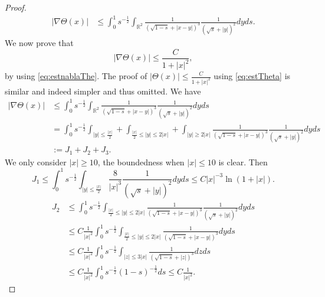 \documentclass[12pt]{amsart}
\numberwithin{equation}{section}              %
\theoremstyle{remark}
\begin{document}
\begin{proof}
			\begin{equation}\label{eq:estnablaThe}
				\begin{aligned}
					|\nabla \Theta(x)| & \leq 	\int_0^1 s^{-\frac{1}{2}} \int_{\mathbb{R}^2} \frac{1}{(\sqrt{1-s}+|x-y|)^3} \frac{1}{(\sqrt{s}+|y|)^2}dy ds.
				\end{aligned}
			\end{equation}
			We now prove that 
			\begin{equation*}
				|\nabla \Theta(x)| \leq \frac{C}{1+|x|^2},
			\end{equation*}
			by using \eqref{eq:estnablaThe}.
			The proof of $| \Theta(x)| \leq \frac{C}{1+|x|^2}$ using \eqref{eq:estTheta} is similar and indeed simpler and thus omitted.
			We have
			\begin{equation*}
				\begin{aligned}
					|\nabla \Theta(x)| & \leq 	\int_0^1 s^{-\frac{1}{2}} \int_{\mathbb{R}^2} \frac{1}{(\sqrt{1-s}+|x-y|)^3} \frac{1}{(\sqrt{s}+|y|)^2}dy ds\\
					& =  	\int_0^1 s^{-\frac{1}{2}} \int_{|y|\leq \frac{|x|}{2}}   
					+ \int_{\frac{|x|}{2}\leq |y|\leq 2|x|}  + 
					\int_{|y|\geq 2|x| }  \frac{1}{(\sqrt{1-s}+|x-y|)^3} \frac{1}{(\sqrt{s}+|y|)^2}dy ds\\
					&:=J_1+J_2+J_3. 
				\end{aligned}
			\end{equation*}
			We only consider $|x|\ge 10$, the boundedness when $|x|\leq 10$ is clear. Then 
			\begin{equation*}
				J_1 \leq \int_0^1 s^{-\frac{1}{2}} \int_{|y|\leq \frac{|x|}{2}}   \frac{8}{|x|^3} \frac{1}{(\sqrt{s}+|y|)^2} dy ds
				\leq C|x|^{-3} \ln(1+|x|).
			\end{equation*}
			\begin{equation*}
				\begin{aligned}
					J_2 &\leq \int_0^1 s^{-\frac{1}{2}} \int_{\frac{|x|}{2}\leq |y|\leq 2|x|} \frac{1}{(\sqrt{1-s}+|x-y|)^3}  \frac{1}{(\sqrt{s}+|y|)^2} dy ds
					\\
					&\leq C\frac{1}{|x|^2}\int_0^1 s^{-\frac{1}{2}} \int_{\frac{|x|}{2}\leq |y|\leq 2|x|} \frac{1}{(\sqrt{1-s}+|x-y|)^3}   dy ds
					\\
					&\leq C\frac{1}{|x|^2}\int_0^1 s^{-\frac{1}{2}} \int_{|z|\leq 3|x|} \frac{1}{(\sqrt{1-s}+|z|)^3}   dz ds\\
					&
					\leq C\frac{1}{|x|^2}\int_0^1 s^{-\frac{1}{2}}(1-s)^{-\frac{1}{2}} ds \leq C\frac{1}{|x|^2}.
				\end{aligned}

\end{equation*}
\end{proof}
\end{document}

